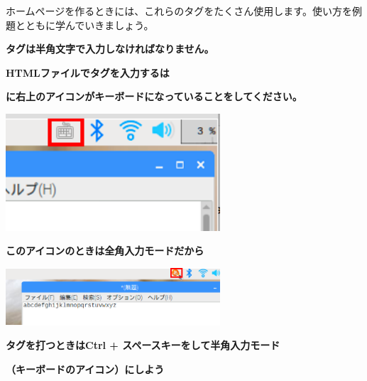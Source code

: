 \bigskip
ホームページを作るときには、これらのタグをたくさん使用します。使い方を例題とともに学んでいきましょう。


\clearpage


{\centering\bfseries
  タグは半角文字で入力しなければなりません。
  \par}

{\centering\bfseries
  HTMLファイルでタグを入力するは
  \par}

{\centering\bfseries
  に右上のアイコンがキーボードになっていることをしてください。
  \par}

\centering
\includegraphics[width=0.6\textwidth]{text01-img/textbook-img159.png}





\bigskip

\bigskip

\bigskip

\bigskip


{\centering\bfseries
  このアイコンのときは全角入力モードだから
  \par}

\centering
\includegraphics[width=0.6\textwidth]{text01-img/textbook-img160.png}


\bigskip


\bigskip

{\centering\bfseries
  タグを打つときはCtrl +
  スペースキーをして半角入力モード
  \par}

{\centering\bfseries
  （キーボードのアイコン）にしよう
  \par}

\clearpage
\flushleft
